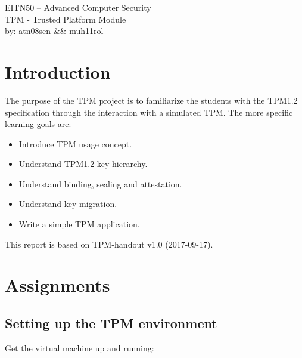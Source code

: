 \documentclass[10pt]{article}
\begin{document}

  \thispagestyle{empty}
  \vspace*{3cm}
  \begin{center}
    \huge{EITN50 -- Advanced Computer Security} \\
    \vspace{0.3cm}
    \LARGE{TPM - Trusted Platform Module} \\
    \vspace{1cm}
    \large{by: atn08sen \&\& muh11rol} \\
  \end{center}


  \newpage

  \section*{Introduction}

    The purpose of the TPM project is to familiarize the students with the
    TPM1.2 specification through the interaction with a simulated TPM. The more
    specific learning goals are:

    \begin{itemize}
      \item{Introduce TPM usage concept.}
      \item{Understand TPM1.2 key hierarchy.}
      \item{Understand binding, sealing and attestation.}
      \item{Understand key migration.}
      \item{Write a simple TPM application.}
    \end{itemize}

    This report is based on TPM-handout v1.0 (2017-09-17).

  \setcounter{section}{2}

  \section{Assignments}

    \subsection{Setting up the TPM environment}

      Get the virtual machine up and running:
\end{document}
